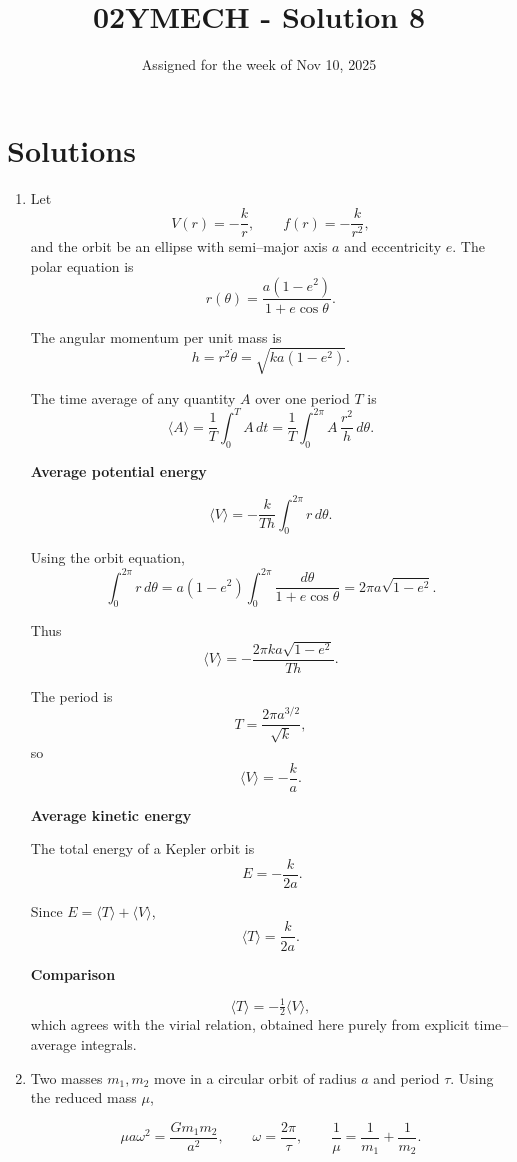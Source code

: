 \documentclass[12pt]{article}
\title{02YMECH - Solution 8}
\date{Assigned for the week of Nov 10, 2025}
\author{}
\begin{document}
\maketitle

\section*{Solutions}

\begin{enumerate}

\item Let
\[
V(r)=-\frac{k}{r}, \qquad f(r)=-\frac{k}{r^2},
\]
and the orbit be an ellipse with semi–major axis \(a\) and eccentricity \(e\).
The polar equation is
\[
r(\theta)=\frac{a(1-e^2)}{1+e\cos\theta}.
\]

The angular momentum per unit mass is
\[
h=r^2\dot\theta=\sqrt{k a(1-e^2)}.
\]

The time average of any quantity \(A\) over one period \(T\) is
\[
\langle A\rangle=\frac{1}{T}\int_0^T A\,dt
=\frac{1}{T}\int_0^{2\pi} A\,\frac{r^2}{h}\,d\theta .
\]

\textbf{Average potential energy}

\[
\langle V\rangle
=-\frac{k}{Th}\int_0^{2\pi} r\,d\theta .
\]

Using the orbit equation,
\[
\int_0^{2\pi} r\,d\theta
=a(1-e^2)\int_0^{2\pi}\frac{d\theta}{1+e\cos\theta}
=2\pi a\sqrt{1-e^2}.
\]

Thus
\[
\langle V\rangle
=-\frac{2\pi k a\sqrt{1-e^2}}{Th}.
\]

The period is
\[
T=\frac{2\pi a^{3/2}}{\sqrt{k}},
\]
so
\[
\boxed{\langle V\rangle=-\frac{k}{a}}.
\]

\newpage

\textbf{Average kinetic energy}

The total energy of a Kepler orbit is
\[\ 
E=-\frac{k}{2a}.
\]

Since \(E=\langle T\rangle+\langle V\rangle\),
\[
\boxed{\langle T\rangle=\frac{k}{2a}}.
\]

\textbf{Comparison}

\[
\boxed{\langle T\rangle=-\tfrac12\langle V\rangle},
\]
which agrees with the virial relation, obtained here purely from explicit
time–average integrals.


\item Two masses \(m_1,m_2\) move in a circular orbit of radius \(a\) and period \(\tau\).
Using the reduced mass \(\mu\),

\[
\mu a\omega^2=\frac{G m_1 m_2}{a^2}, 
\qquad 
\omega=\frac{2\pi}{\tau},
\qquad
\frac{1}{\mu}=\frac{1}{m_1}+\frac{1}{m_2}.
\]


\end{enumerate}
\end{document}
